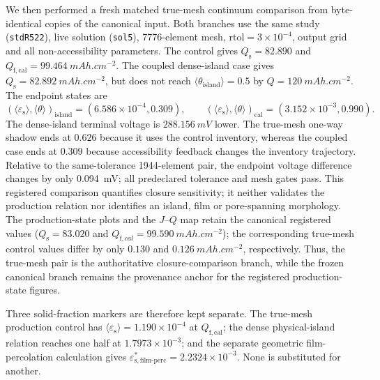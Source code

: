 \documentclass[11pt]{article}
\newcommand{\epss}{\varepsilon_{\mathrm{s}}}
\newcommand{\thetaisland}{\theta_{\mathrm{island}}}
\newcommand{\Qfcal}{Q_{\mathrm{f,cal}}}
\begin{document}
We then performed a fresh matched true-mesh continuum comparison from byte-identical copies of the canonical
input. Both branches use the same study (\texttt{stdR522}), live solution (\texttt{sol5}), 7776-element
mesh, $\mathrm{rtol}=3\times10^{-4}$, output grid and all non-accessibility parameters. The control gives
$Q_{\mathrm s}=82.890$ and $\Qfcal=99.464~\si{mAh.cm^{-2}}$. The coupled dense-island case gives
$Q_{\mathrm s}=82.892~\si{mAh.cm^{-2}}$, but does not reach $\langle\thetaisland\rangle=0.5$ by
$Q=120~\si{mAh.cm^{-2}}$. The endpoint states are
\[
(\langle\epss\rangle,\langle\theta\rangle)_{\mathrm{island}}
=(6.586\times10^{-4},0.309),\qquad
(\langle\epss\rangle,\langle\theta\rangle)_{\mathrm{cal}}
=(3.152\times10^{-3},0.990).
\]
The dense-island terminal voltage is $\SI{288.156}{mV}$ lower. The true-mesh one-way shadow ends at $0.626$
because it uses the control inventory, whereas the coupled case ends at $0.309$ because accessibility feedback
changes the inventory trajectory. Relative to the same-tolerance 1944-element pair, the endpoint voltage
difference changes by only \SI{0.094}{mV}; all predeclared tolerance and mesh gates pass. This registered
comparison quantifies closure sensitivity; it neither validates the production relation nor
identifies an island, film or pore-spanning morphology.
The production-state plots and the $J$--$Q$ map retain the canonical registered values
($Q_{\mathrm s}=83.020$ and $Q_{\mathrm f,cal}=99.590~\si{mAh.cm^{-2}}$); the corresponding true-mesh
control values differ by only $0.130$ and $0.126~\si{mAh.cm^{-2}}$, respectively. Thus, the true-mesh pair
is the authoritative closure-comparison branch, while the frozen canonical branch remains the provenance
anchor for the registered production-state figures.

Three solid-fraction markers are therefore kept separate. The true-mesh production control has
$\langle\epss\rangle=1.190\times10^{-4}$ at $\Qfcal$; the dense physical-island relation reaches one half at
$1.7973\times10^{-3}$; and the separate geometric film-percolation calculation gives
$\varepsilon_{\mathrm{s,film\text{-}perc}}^{*}=2.2324\times10^{-3}$. None is substituted for another.
\end{document}
